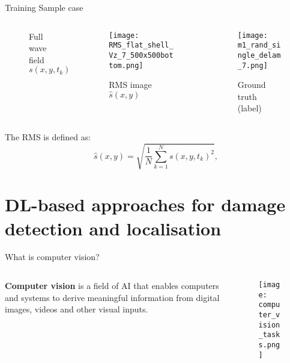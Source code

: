 \documentclass[10pt,aspectratio=169,dvipsnames]{beamer} %
\begin{document}
	\setcounter{subfigure}{0}
	\begin{frame}{Training Sample case}
		\begin{columns}[T]
			\begin{column}[c]{.32\textwidth}
				\begin{figure}
					\centering
					\caption{Full wavefield $s(x,y,t_k)$}
				\end{figure}
			\end{column}
			\begin{column}[c]{.32\textwidth}
				\begin{figure}
					\centering
					\texttt{[image: RMS\_flat\_shell\_Vz\_7\_500x500bottom.png]}
					\caption{RMS image $\hat{s}(x,y)$}
				\end{figure}
			\end{column}
			\begin{column}[c]{.32\textwidth}
				\begin{figure}
					\centering
					\texttt{[image: m1\_rand\_single\_delam\_7.png]}
					\caption{Ground truth (label)}
				\end{figure}
			\end{column}
		\end{columns}
		The RMS is defined as:
		\begin{equation}
			\hat{s}(x,y) = \sqrt{\frac{1}{N}\sum_{k=1}^{N}s(x,y,t_k)^2}, 
			\label{eqn:rms} 
		\end{equation}
	\end{frame}
	\section{DL-based approaches for damage detection and localisation}
	\setcounter{subfigure}{0}
	\begin{frame}{What is computer vision?}
		\begin{columns}[T]
			\begin{column}[c]{0.30\textwidth}
				\justifying
				\alert{\textbf{Computer vision} is a field of AI that enables computers and systems to derive meaningful information from digital images, videos and other visual inputs.} 
			\end{column}
			\hfill
			\begin{column}[c]{0.65\textwidth}
				\begin{figure}
					\centering
					\texttt{[image: computer\_vision\_tasks.png]}
				\end{figure}
			\end{column}
		\end{columns}
	\end{frame}
\end{document}
